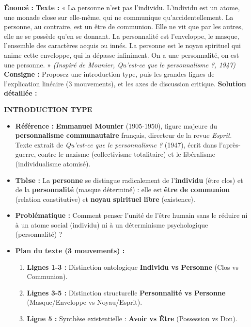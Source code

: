 \documentclass[11pt]{article}
\begin{document}
\begin{exoresolu}
\textbf{Énoncé :} \textbf{Texte :} « La personne n'est pas l'individu. L'individu est un atome, une monade close sur elle-même, qui ne communique qu'accidentellement. La personne, au contraire, est un être de communion. Elle ne vit que par les autres, elle ne se possède qu'en se donnant. La personnalité est l'enveloppe, le masque, l'ensemble des caractères acquis ou innés. La personne est le noyau spirituel qui anime cette enveloppe, qui la dépasse infiniment. On a une personnalité, on est une personne. »
\textit{(Inspiré de Mounier, \textit{Qu'est-ce que le personnalisme ?}, 1947)}
\textbf{Consigne :} Proposez une introduction type, puis les grandes lignes de l'explication linéaire (3 mouvements), et les axes de discussion critique.
\tcblower
\textbf{Solution détaillée :}

\textbf{INTRODUCTION TYPE}
\begin{itemize}
    \item \textbf{Référence :} \textbf{Emmanuel Mounier} (1905-1950), figure majeure du \textbf{personnalisme communautaire} français, directeur de la revue \textit{Esprit}. Texte extrait de \textit{Qu'est-ce que le personnalisme ?} (1947), écrit dans l'après-guerre, contre le nazisme (collectivisme totalitaire) et le libéralisme (individualisme atomisé).
    \item \textbf{Thèse :} La \textbf{personne} se distingue radicalement de l'\textbf{individu} (être clos) et de la \textbf{personnalité} (masque déterminé) : elle est \textbf{être de communion} (relation constitutive) et \textbf{noyau spirituel libre} (existence).
    \item \textbf{Problématique :} Comment penser l'unité de l'être humain sans le réduire ni à un atome social (individu) ni à un déterminisme psychologique (personnalité) ?
    \item \textbf{Plan du texte (3 mouvements) :}
    \begin{enumerate}
        \item \textbf{Lignes 1-3 :} Distinction ontologique \textbf{Individu vs Personne} (Clos vs Communion).
        \item \textbf{Lignes 3-5 :} Distinction structurelle \textbf{Personnalité vs Personne} (Masque/Enveloppe vs Noyau/Esprit).
        \item \textbf{Ligne 5 :} Synthèse existentielle : \textbf{Avoir vs Être} (Possession vs Don).
    \end{enumerate}
\end{itemize}


\end{exoresolu}
\end{document}
